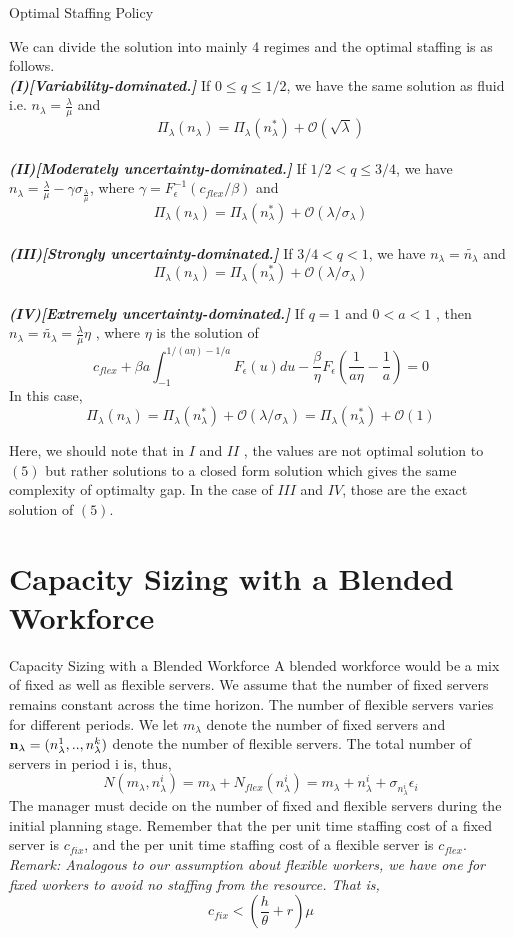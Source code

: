 \documentclass[8pt]{beamer}
\begin{document}
\begin{frame}{Optimal Staffing Policy}
    \begin{theorem}
We can divide the solution into mainly 4 regimes and the optimal staffing is as follows.
\\\textbf{\textit{(I)[Variability-dominated.]}} If $0\leq q \leq 1/2$, we have the same solution as fluid i.e. ${n_\lambda}=\frac{\lambda}{\mu}$ and $$\Pi_\lambda({n_\lambda})=\Pi_\lambda(n_\lambda^{*})+\mathcal{O}(\sqrt{\lambda})$$
\\\textbf{\textit{(II)[Moderately uncertainty-dominated.]}} If $1/2 < q \leq 3/4 $, we have ${n_\lambda}=\frac{\lambda}{\mu}-\gamma\sigma_{\frac{\lambda}{\mu}}$, where $\gamma = F_{\epsilon}^{-1}(c_{flex}/\beta)$ and
$$\Pi_\lambda({n_\lambda})=\Pi_\lambda(n_\lambda^{*})+\mathcal{O}(\lambda/\sigma_\lambda)$$
\\\textbf{\textit{(III)[Strongly uncertainty-dominated.]}} If $3/4 < q < 1 $, we have $n_\lambda = \tilde{n_\lambda}$ and
$$\Pi_\lambda({n_\lambda})=\Pi_\lambda(n_\lambda^{*})+\mathcal{O}(\lambda/\sigma_\lambda)$$
\\\textbf{\textit{(IV)[Extremely uncertainty-dominated.]}} If $q=1$ and $ 0 < a <1$ , then $n_\lambda= \tilde{n_\lambda} = \frac{\lambda}{\mu}\eta$ , where $\eta$ is the solution of 
$$c_{flex}+\beta a \int_{-1}^{1/(a\eta)-1/a}{F_\epsilon(u)du}-\frac{\beta}{\eta}F_\epsilon(\frac{1}{a\eta}-\frac{1}{a})=0$$
In this case,
$$\Pi_\lambda({n_\lambda})=\Pi_\lambda(n_\lambda^{*})+\mathcal{O}(\lambda/\sigma_\lambda)=\Pi_\lambda(n_\lambda^{*})+\mathcal{O}(1)$$
\end{theorem}
Here, we should note that in $I$ and $II$ , the values are not optimal solution to $(5)$ but rather solutions to a closed form solution which gives the same complexity of optimalty gap. In the case of $III$ and $IV$, those are the exact solution of $(5)$.
\end{frame}
\section{Capacity Sizing with a Blended Workforce}
\begin{frame}{Capacity Sizing with a Blended Workforce}
A blended workforce would be a mix of fixed as well as flexible servers. We assume that the number of fixed servers remains constant across the time horizon. The number of flexible servers varies for different periods. We let $m_{\lambda}$ denote the number of fixed servers and $\bold{n}_{\lambda} = (n_{\lambda}^1,..,n_{\lambda}^k)$ denote the number of flexible servers. The total number of servers in period i is, thus, 
\[N(m_{\lambda},n_{\lambda}^i) = m_{\lambda} +N_{flex}(n_{\lambda}^i) = m_{\lambda} + n_{\lambda}^i + \sigma_{n_{\lambda}^i}\epsilon_i\]
The manager must decide on the number of fixed and flexible servers during the initial planning stage. Remember that the per unit time staffing cost of a fixed server is $c_{fix}$, and the per unit time staffing cost of a flexible server is $c_{flex}$. \\
\bigskip
\textit{Remark:
Analogous to our assumption about flexible workers, we have one for fixed workers to avoid no staffing from the resource. That is, }\[c_{fix} < (\frac{h}{\theta} + r)\mu\]
\end{frame}
\end{document}
